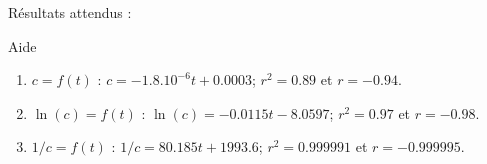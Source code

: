 \documentclass[a4paper, 12pt, final, garamond]{book}
\begin{document}
Résultats attendus :

\begin{instruc}[tikz={rotate=180, transform shape}]{Aide}
    \begin{enumerate}
        \item $c = f(t)$ : $c = -\num{1,8}.10^{-6} t + \num{0,0003}$; $r^2 =
            \num{0,89}$ et $r = - \num{0,94}$.
        \item $\ln(c) = f(t)$ : $\ln(c) = -\num{0,0115} t - \num{8,0597}$; $r^2 =
            \num{0,97}$ et $r = - \num{0,98}$.
        \item $1/c = f(t)$ : $1/c = \num{80,185} t + \num{1993,6}$; $r^2 =
            \num{0,999991}$ et $r = - \num{0,999995}$.
    \end{enumerate}
\end{instruc}
\end{document}
